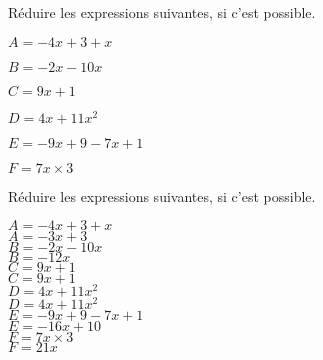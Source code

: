 \begin{exercice*}
    Réduire les expressions suivantes, si c'est possible.
    \begin{multicols}{2}
        \begin{itemize}
            \begin{spacing}{1.2}
                \item[] $A=-4x+3+x$
                \item[] $B=-2x-10x$
                \item[] $C=9x+1$
                \item[] $D=4x+11x^2$
                \item[] $E=-9x+9-7x+1$
                \item[] $F=7x\times 3$
            \end{spacing}
        \end{itemize}
    \end{multicols}
\end{exercice*}
\begin{corrige}
    Réduire les expressions suivantes, si c'est possible.
    \begin{multicols}{2}
        \begin{itemize}
            \def\item{}
            \item $A=-4x+3+x$\\
            {\red $A=-3x+3$}\\\smallskip
            \item $B=-2x-10x$\\
            {\red $B=-12x$}\\\smallskip
            \item $C=9x+1$\\
            {\red $C=9x+1$}\\\smallskip
            \item $D=4x+11x^2$\\
            {\red $D=4x+11x^2$}\\\smallskip
            \item $E=-9x+9-7x+1$\\
            {\red $E=-16x+10$}\\\smallskip
            \item $F=7x\times 3$\\
            {\red $F=21x$}
        \end{itemize}
    \end{multicols}
    \vspace*{-5mm}
\end{corrige}

